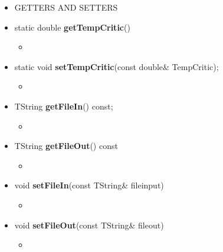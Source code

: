 \begin{itemize}
\begin{itemize}
\newpage
			
		\item[]	GETTERS AND SETTERS \\
	
			\item[] static double \textbf{getTempCritic}()		 
			\begin{itemize}
				\item[] 
			\end{itemize}
			
			\item[] static void \textbf{setTempCritic}(const double\& \textunderscore TempCritic);		 
			\begin{itemize}
				\item[] 
			\end{itemize}
			
			\item[] TString \textbf{getFileIn}() const;
			\begin{itemize}
				\item[] 
			\end{itemize}
			
			\item[] TString \textbf{getFileOut}() const		 
			\begin{itemize}
				\item[] 
			\end{itemize}	
			
			\item[]  void \textbf{setFileIn}(const TString\& file\textunderscore input)		 
			\begin{itemize}
				\item[] 
			\end{itemize}
			
			\item[] void \textbf{setFileOut}(const TString\& file\textunderscore out)				 
			\begin{itemize}
				\item[] 
			\end{itemize}
			
	\end{itemize}

	
\end{itemize}